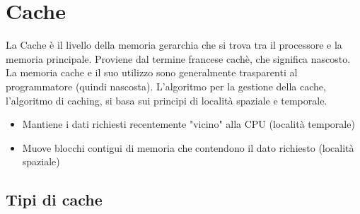 \documentclass[12pt, a4paper, openany]{book}
\begin{document}
\section{Cache}
La Cache è il livello della memoria gerarchia che si trova tra il processore e la memoria principale.
Proviene dal termine francese cachè, che significa nascosto. La memoria cache e il suo utilizzo sono generalmente
trasparenti al programmatore (quindi nascosta).
L'algoritmo per la gestione della cache, l'algoritmo di caching, si basa sui principi di località spaziale e temporale.
\begin{itemize}
    \item Mantiene i dati richiesti recentemente "vicino" alla CPU (località temporale)
    \item Muove blocchi contigui di memoria che contendono il dato richiesto (località spaziale)
\end{itemize}

\subsection{Tipi di cache}
\end{document}
